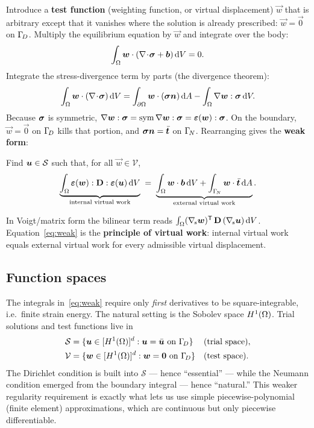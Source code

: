 Introduce a \textbf{test function} (weighting function, or virtual
displacement) $\vec w$ that is arbitrary except that it vanishes where
the solution is already prescribed: $\vec w=\vec 0$ on $\Gamma_{\!D}$.
Multiply the equilibrium equation by $\vec w$ and integrate over the
body:
\begin{equation}
  \int_\Omega \bm{w}\cdot(\nabla\!\cdot\!\bm{\sigma}+\bm{b})\,\mathrm{d} V = 0 .
\end{equation}
Integrate the stress-divergence term by parts (the divergence theorem):
\begin{equation}
  \int_\Omega \bm{w}\cdot(\nabla\!\cdot\!\bm{\sigma})\,\mathrm{d} V
   = \int_{\partial\Omega}\bm{w}\cdot(\bm{\sigma}\bm{n})\,\mathrm{d} A
   - \int_\Omega \nabla\bm{w} : \bm{\sigma} \,\mathrm{d} V .
\end{equation}
Because $\bm{\sigma}$ is symmetric, $\nabla\bm{w}:\bm{\sigma}
=\operatorname{sym}\nabla\bm{w}:\bm{\sigma}=\bm{\varepsilon}(\bm{w}):\bm{\sigma}$. On the boundary,
$\vec w=\vec 0$ on $\Gamma_{\!D}$ kills that portion, and
$\bm{\sigma}\bm{n}=\bar{\bm{t}}$ on $\Gamma_{\!N}$. Rearranging gives the
\textbf{weak form}:

\begin{tcolorbox}[colback=gray!5,colframe=gray!55!black,arc=2pt]
Find $\bm{u}\in\mathcal S$ such that, for all $\vec w\in\mathcal V$,
\begin{equation}
  \underbrace{\int_\Omega \bm{\varepsilon}(\bm{w}):\mathbf{D}:\bm{\varepsilon}(\bm{u})\,\mathrm{d} V}_{\text{internal virtual work}}
  \;=\;
  \underbrace{\int_\Omega \bm{w}\cdot\bm{b}\,\mathrm{d} V
   + \int_{\Gamma_{\!N}}\bm{w}\cdot\bar{\bm{t}}\,\mathrm{d} A}_{\text{external virtual work}} .
  \label{eq:weak}
\end{equation}
\end{tcolorbox}

\noindent In Voigt/matrix form the bilinear term reads
$\int_\Omega (\nabla_{\!s}\bm{w})^{\mathsf{T}}\,\mathbf{D}\,(\nabla_{\!s}\bm{u})\,\mathrm{d} V$.
Equation~\eqref{eq:weak} is the \textbf{principle of virtual work}:
internal virtual work equals external virtual work for every admissible
virtual displacement.

\subsection{Function spaces}

The integrals in~\eqref{eq:weak} require only \emph{first} derivatives to
be square-integrable, i.e.\ finite strain energy. The natural setting is
the Sobolev space $H^1(\Omega)$. Trial solutions and test functions
live in
\begin{align}
  \mathcal S &= \{\bm{u}\in[H^1(\Omega)]^d : \bm{u}=\bar{\bm{u}}\text{ on }\Gamma_{\!D}\}
    &&\text{(trial space)},\\
  \mathcal V &= \{\bm{w}\in[H^1(\Omega)]^d : \bm{w}=\bm{0}\text{ on }\Gamma_{\!D}\}
    &&\text{(test space)}.
\end{align}
The Dirichlet condition is built into $\mathcal S$ --- hence
``essential'' --- while the Neumann condition emerged from the boundary
integral --- hence ``natural.'' This weaker regularity requirement is
exactly what lets us use simple piecewise-polynomial (finite element)
approximations, which are continuous but only piecewise differentiable.

